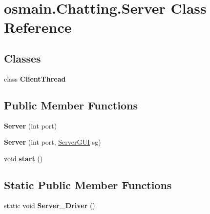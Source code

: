 \hypertarget{classosmain_1_1_chatting_1_1_server}{}\section{osmain.\+Chatting.\+Server Class Reference}
\label{classosmain_1_1_chatting_1_1_server}
\subsection*{Classes}
\begin{DoxyCompactItemize}
\item 
class {\bfseries Client\+Thread}
\end{DoxyCompactItemize}
\subsection*{Public Member Functions}
\begin{DoxyCompactItemize}
\item 
{\bfseries Server} (int port)\hypertarget{classosmain_1_1_chatting_1_1_server_a65648d064a521815f9e5025b8ec204ae}{}\label{classosmain_1_1_chatting_1_1_server_a65648d064a521815f9e5025b8ec204ae}

\item 
{\bfseries Server} (int port, \hyperlink{classosmain_1_1_chatting_1_1_server_g_u_i}{Server\+G\+UI} sg)\hypertarget{classosmain_1_1_chatting_1_1_server_a959371da05a2e3e1d2ced543510ef02a}{}\label{classosmain_1_1_chatting_1_1_server_a959371da05a2e3e1d2ced543510ef02a}

\item 
void {\bfseries start} ()\hypertarget{classosmain_1_1_chatting_1_1_server_ad513f8dc22d5c97816965f953de6d401}{}\label{classosmain_1_1_chatting_1_1_server_ad513f8dc22d5c97816965f953de6d401}

\end{DoxyCompactItemize}
\subsection*{Static Public Member Functions}
\begin{DoxyCompactItemize}
\item 
static void {\bfseries Server\+\_\+\+Driver} ()\hypertarget{classosmain_1_1_chatting_1_1_server_a803ab6c0cd4610341b305dc147bf786d}{}\label{classosmain_1_1_chatting_1_1_server_a803ab6c0cd4610341b305dc147bf786d}

\end{DoxyCompactItemize}
